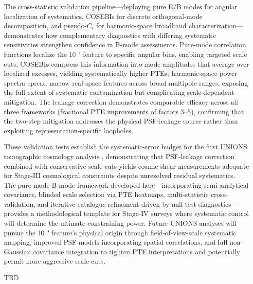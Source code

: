 \documentclass{aa}
\begin{document}
The cross-statistic validation pipeline—deploying pure E/B modes for angular localization of systematics, COSEBIs for discrete orthogonal-mode decomposition, and pseudo-$C_\ell$ for harmonic-space broadband characterization—demonstrates how complementary diagnostics with differing systematic sensitivities strengthen confidence in B-mode assessments. Pure-mode correlation functions localize the \SI{10}{\arcmin} feature to specific angular bins, enabling targeted scale cuts; COSEBIs compress this information into mode amplitudes that average over localized excesses, yielding systematically higher PTEs; harmonic-space power spectra spread narrow real-space features across broad multipole ranges, exposing the full extent of systematic contamination but complicating scale-dependent mitigation. The leakage correction demonstrates comparable efficacy across all three frameworks (fractional PTE improvements of factors \num{3}--\num{5}), confirming that the two-step mitigation addresses the physical PSF-leakage source rather than exploiting representation-specific loopholes.

These validation tests establish the systematic-error budget for the first UNIONS tomographic cosmology analysis \citep{goh.etal25}, demonstrating that PSF-leakage correction combined with conservative scale cuts yields cosmic shear measurements adequate for Stage-III cosmological constraints despite unresolved residual systematics. The pure-mode B-mode framework developed here—incorporating semi-analytical covariance, blinded scale selection via PTE heatmaps, multi-statistic cross-validation, and iterative catalogue refinement driven by null-test diagnostics—provides a methodological template for Stage-IV surveys where systematic control will determine the ultimate constraining power. Future UNIONS analyses will pursue the \SI{10}{\arcmin} feature's physical origin through field-of-view-scale systematic mapping, improved PSF models incorporating spatial correlations, and full non-Gaussian covariance integration to tighten PTE interpretations and potentially permit more aggressive scale cuts.

\begin{acknowledgements}
TBD
\end{acknowledgements}




\end{document}

